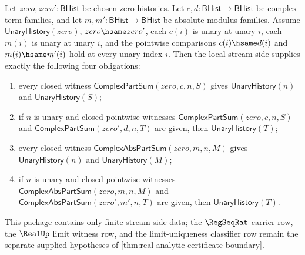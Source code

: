 \begin{theorem}
\label{thm:real-analytic-local-stream-obligations-only}
Let $zero,zero':\mathsf{BHist}$ be chosen zero histories. Let
$c,d:\mathsf{BHist}\to\mathsf{BHist}$ be complex term families, and let
$m,m':\mathsf{BHist}\to\mathsf{BHist}$ be absolute-modulus families. Assume
$\mathsf{UnaryHistory}(zero)$, $zero\hsame zero'$, each $c(i)$ is unary at
unary $i$, each $m(i)$ is unary at unary $i$, and the pointwise comparisons
$c(i)\hsame d(i)$ and $m(i)\hsame m'(i)$ hold at every unary index $i$. Then
the local stream side supplies exactly the following four obligations:
\begin{enumerate}
\item every closed witness $\mathsf{ComplexPartSum}(zero,c,n,S)$ gives
$\mathsf{UnaryHistory}(n)$ and $\mathsf{UnaryHistory}(S)$;
\item if $n$ is unary and closed pointwise witnesses
$\mathsf{ComplexPartSum}(zero,c,n,S)$ and
$\mathsf{ComplexPartSum}(zero',d,n,T)$ are given, then
$\mathsf{UnaryHistory}(T)$;
\item every closed witness $\mathsf{ComplexAbsPartSum}(zero,m,n,M)$ gives
$\mathsf{UnaryHistory}(n)$ and $\mathsf{UnaryHistory}(M)$;
\item if $n$ is unary and closed pointwise witnesses
$\mathsf{ComplexAbsPartSum}(zero,m,n,M)$ and
$\mathsf{ComplexAbsPartSum}(zero',m',n,T)$ are given, then
$\mathsf{UnaryHistory}(T)$.
\end{enumerate}
This package contains only finite stream-side data; the $\RegSeqRat$ carrier
row, the $\RealUp$ limit witness row, and the limit-uniqueness classifier row
remain the separate supplied hypotheses of
\autoref{thm:real-analytic-certificate-boundary}.
\end{theorem}
